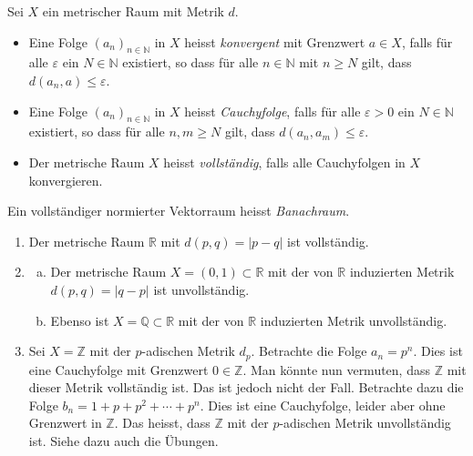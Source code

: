 \documentclass[../main.tex]{subfiles}
\begin{document}
\newpage

\begin{definitions}
  Sei $X$ ein metrischer Raum mit Metrik $d$.
  \begin{itemize}
    \item Eine Folge ${(a_{n})}_{n \in \mathbb{N}}$ in
      $X$ heisst \emph{konvergent} mit Grenzwert
      $a \in X$, falls für alle $\varepsilon$ 
      ein $N \in \mathbb{N}$ existiert,
      so dass für alle $n \in \mathbb{N}$ mit $n \geq N$ 
      gilt, dass $d(a_n, a) \leq \varepsilon$.
    \item Eine Folge ${(a_{n})}_{n \in \mathbb{N}}$ in $X$ 
      heisst \emph{Cauchyfolge}, falls für alle $\varepsilon > 0$ 
      ein $N \in \mathbb{N}$ existiert, so dass für
      alle $n, m \geq N$ gilt, dass
      $d(a_n, a_m) \leq \varepsilon$.
    \item Der metrische Raum $X$ heisst \emph{vollständig},
      falls alle Cauchyfolgen in $X$ konvergieren.
  \end{itemize}
  Ein vollständiger normierter Vektorraum heisst \emph{Banachraum}.
\end{definitions}

\begin{examples}
  \leavevmode
  \begin{enumerate}[(1)]
    \item Der metrische Raum $\mathbb{R}$ mit $d(p, q) = |p - q|$ 
      ist vollständig.
    \item
      \begin{enumerate}[(a)]
        \item Der metrische Raum $X = (0, 1) \subset \mathbb{R}$ 
          mit der von $\mathbb{R}$ induzierten
          Metrik $d(p, q) = |q - p|$ ist unvollständig.
        \item Ebenso ist $X = \mathbb{Q} \subset \mathbb{R}$ mit
           der von $\mathbb{R}$ induzierten Metrik unvollständig.
      \end{enumerate}
    \item Sei $X = \mathbb{Z}$ mit der $p$-adischen Metrik $d_p$.
      Betrachte die Folge $a_n = p^n$.
      Dies ist eine Cauchyfolge mit Grenzwert $0 \in \mathbb{Z}$.
      Man könnte nun vermuten, dass $\mathbb{Z}$ mit dieser
      Metrik vollständig ist. Das ist jedoch nicht der Fall.
      Betrachte dazu die Folge $b_n = 1 + p + p^2 + \cdots + p^n$.
      Dies ist eine Cauchyfolge, leider aber ohne Grenzwert
      in $\mathbb{Z}$.
      Das heisst, dass $\mathbb{Z}$ mit der $p$-adischen Metrik
      unvollständig ist. Siehe dazu auch die Übungen.
  \end{enumerate}
\end{examples}
\end{document}
